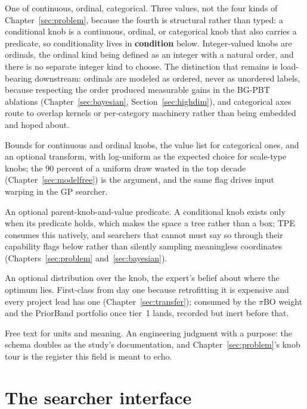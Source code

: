 \begin{description}[style=nextline, leftmargin=1.6em, itemsep=2pt]
\item[kind] One of continuous, ordinal, categorical. Three values,
not the four kinds of Chapter~\ref{sec:problem}, because the fourth
is structural rather than typed: a conditional knob is a continuous,
ordinal, or categorical knob that also carries a predicate, so
conditionality lives in \textbf{condition} below. Integer-valued
knobs are ordinals, the ordinal kind being defined as an integer with
a natural order, and there is no separate integer kind to choose. The
distinction that remains
is load-bearing downstream: ordinals are modeled as ordered, never as
unordered labels, because respecting the order produced measurable
gains in the BG-PBT ablations (Chapter~\ref{sec:bayesian},
Section~\ref{sec:highdim}), and categorical axes route to overlap
kernels or per-category machinery rather than being embedded and
hoped about.
\item[range and transform] Bounds for continuous and ordinal knobs,
the value list for categorical ones, and an optional transform, with
log-uniform as the expected choice for scale-type knobs; the 90
percent of a uniform draw wasted in the top decade
(Chapter~\ref{sec:modelfree}) is the argument, and the same flag
drives input warping in the GP searcher.
\item[condition] An optional parent-knob-and-value predicate. A
conditional knob exists only when its predicate holds, which makes
the space a tree rather than a box; TPE consumes this natively, and
searchers that cannot must say so through their capability flags
below rather than silently sampling meaningless coordinates
(Chapters~\ref{sec:problem} and~\ref{sec:bayesian}).
\item[prior] An optional distribution over the knob, the expert's
belief about where the optimum lies. First-class from day one
because retrofitting it is expensive and every project lead has one
(Chapter~\ref{sec:transfer}); consumed by the $\pi$BO weight and the
PriorBand portfolio once tier~1 lands, recorded but inert before
that.
\item[note] Free text for units and meaning. An engineering judgment
with a purpose: the schema doubles as the study's documentation, and
Chapter~\ref{sec:problem}'s knob tour is the register this field is
meant to echo.
\end{description}

\section{The searcher interface}

